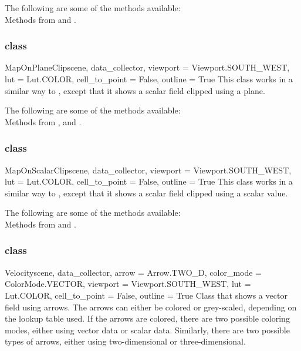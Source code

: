 The following are some of the methods available:\\
Methods from \ActorThreeD and \Transform.

\subsubsection{\MapOnPlaneClip class}

\begin{classdesc}{MapOnPlaneClip}{scene, data_collector,
viewport = Viewport.SOUTH_WEST, lut = Lut.COLOR, cell_to_point = False, 
outline = True}
This class works in a similar way to \MapOnPlaneCut, except that it shows a 
scalar field clipped using a plane. 
\end{classdesc}

The following are some of the methods available:\\
Methods from \ActorThreeD, \Transform and \Clipper.

\subsubsection{\MapOnScalarClip class}

\begin{classdesc}{MapOnScalarClip}{scene, data_collector, 
viewport = Viewport.SOUTH_WEST, lut = Lut.COLOR, cell_to_point = False, 
outline = True}
This class works in a similar way to \Map, except that it shows a scalar 
field clipped using a scalar value. 
\end{classdesc}

The following are some of the methods available:\\
Methods from \ActorThreeD and \Clipper.

\subsubsection{\Velocity class}

\begin{classdesc}{Velocity}{scene, data_collector, arrow = Arrow.TWO_D, 
color_mode = ColorMode.VECTOR, viewport = Viewport.SOUTH_WEST,  
lut = Lut.COLOR, cell_to_point = False, outline = True}
Class that shows a vector field using arrows. The arrows can either be 
colored or grey-scaled, depending on the lookup table used. If the arrows 
are colored, there are two possible coloring modes, either using vector data or 
scalar data. Similarly, there are two possible types of arrows, either 
using two-dimensional or three-dimensional.
\end{classdesc}

